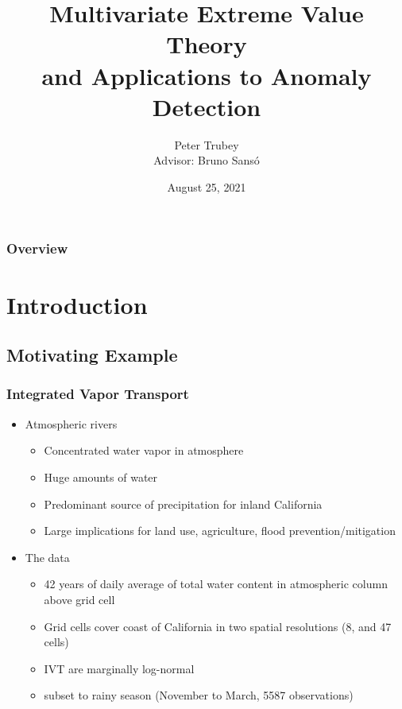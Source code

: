 \documentclass[aspectratio=169]{beamer}
\title{Multivariate Extreme Value Theory \\ and Applications to Anomaly Detection}
\author{Peter Trubey \\ Advisor: Bruno Sans{\'o}}
\institute{UCSC - Statistics Department}
\date[8/25/2021]{August 25, 2021}
\begin{document}
\begin{frame}[plain]
  \titlepage
\end{frame}

\begin{frame}[plain]
  \frametitle{Overview}
  \tableofcontents
\end{frame}


\section{Introduction}
\subsection{Motivating Example}
\begin{frame}
  \frametitle{Integrated Vapor Transport}
  \begin{minipage}{.7\textwidth}
    \begin{itemize}
        \item Atmospheric rivers~\citep{ralph2013,ralph2018}
            \begin{itemize}
                \item Concentrated water vapor in atmosphere
                \item Huge amounts of water
                \item Predominant source of precipitation for inland California
                \item Large implications for land use, agriculture, flood prevention/mitigation
            \end{itemize}
        \item The data~\citep{guan2015}
            \begin{itemize}
                \item 42 years of daily average of total water content in atmospheric column above grid cell
                \item Grid cells cover coast of California in two spatial resolutions (8, and 47 cells) 
                \item IVT are marginally log-normal
                \item subset to rainy season (November to March, 5587 observations)
            \end{itemize}
    \end{itemize}
  \end{minipage}
  ~\hfill
  \begin{minipage}{.25\textwidth}
    \centering

\end{minipage}
\end{frame}
\end{document}
